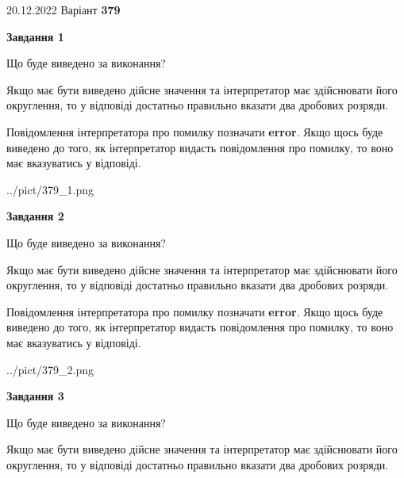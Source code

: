\documentclass[12pt, ukrainian]{article}
\begin{document}
{20.12.2022 Варіант \No \textbf { 379 }\par}
{
\begin {Large}

{\begin {center}\textbf{Завдання 1}\end {center}}\par
Що буде виведено за виконання? \par

Якщо має бути виведено дійсне значення та інтерпретатор має здійснювати його округлення, 
то у відповіді достатньо правильно вказати два дробових розряди.

Повідомлення інтерпретатора про помилку позначати \textbf{error}.
Якщо щось буде виведено до того, як інтерпретатор видасть повідомлення про помилку, 
то воно має вказуватись у відповіді. \par

\begin{center}
	{../pict/379_1.png}
\end{center}
\newpage

{\begin {center}\textbf{Завдання 2}\end {center}}\par
Що буде виведено за виконання? \par

Якщо має бути виведено дійсне значення та інтерпретатор має здійснювати його округлення, 
то у відповіді достатньо правильно вказати два дробових розряди.

Повідомлення інтерпретатора про помилку позначати \textbf{error}.
Якщо щось буде виведено до того, як інтерпретатор видасть повідомлення про помилку, 
то воно має вказуватись у відповіді. \par

\begin{center}
	{../pict/379_2.png}
\end{center}
\newpage

{\begin {center}\textbf{Завдання 3}\end {center}}\par
Що буде виведено за виконання? \par

Якщо має бути виведено дійсне значення та інтерпретатор має здійснювати його округлення, 
то у відповіді достатньо правильно вказати два дробових розряди.


\end{Large}}
\end{document}
